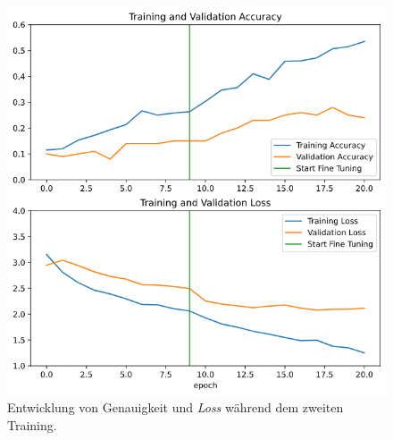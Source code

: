 \documentclass[a4paper,12pt,ngerman]{article}
\begin{document}
\newpage
\begin{figure}[ht]
\includegraphics[width=\linewidth]{second_training}
\centering
\caption{Entwicklung von Genauigkeit und \textit{Loss} während dem zweiten Training.}
\end{figure}
\end{document}
